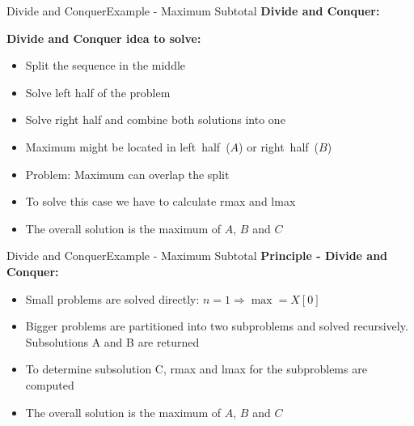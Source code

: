 \begin{frame}{Divide and Conquer}{Example - Maximum Subtotal}
  \textbf{Divide and Conquer:}
  \vspace{-1.5em}
  \begin{figure}
    \begin{adjustbox}{width=\linewidth}
      
    \end{adjustbox}
    \label{fig:divide_and_conquer:max_sub_total_divide}
  \end{figure}
   \vspace{-1.5em}
\textbf{Divide and Conquer idea to solve:}
  \begin{itemize}
  \item<1->
    Split the sequence in the middle
  \item<2->
    Solve left half of the problem
  \item<3->
    Solve right half and combine both solutions into one
  \item<4->
    Maximum might be located in {\color{MainA}left~half~($A$)}
    or {\color{MainA}right~half~($B$)}
  \item<5->
    Problem: Maximum can {\color{MainA} overlap the split}
  \item<6->
    To solve this case we have to calculate {\color{MainA}rmax}
    and {\color{MainA}lmax}
  \item<7->
    The overall solution is the {\color{MainA}maximum of $A$, $B$ and $C$}
  \end{itemize}
\end{frame}


\begin{frame}{Divide and Conquer}{Example - Maximum Subtotal}
  \textbf{Principle - Divide and Conquer:}
  \begin{itemize}
    \item<2->
      Small problems are solved directly:
      {\color{MainA}$n = 1 \Rightarrow \max = X[0]$}
    \item<3->
      Bigger problems are partitioned into two subproblems
      and solved recursively.
      Subsolutions {\color{MainA}A} and {\color{MainA}B} are returned
    \item<4->
      To determine subsolution {\color{MainA}C}, {\color{MainA}rmax}
      and {\color{MainA}lmax} for the subproblems are computed
    \item<5->
      The overall solution is the {\color{MainA}maximum of $A$, $B$ and $C$}
  \end{itemize}
\end{frame}

